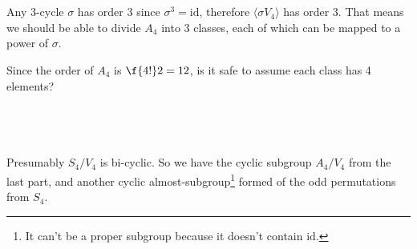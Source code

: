 \documentclass[a4paper]{article}
\begin{document}
\subsection{~} %

Any 3-cycle $\sigma$ has order 3 since $\sigma^3 = \mathrm{id}$, therefore $\langle \sigma V_4 \rangle$ has order 3. That means we should be able to divide $A_4$ into 3 classes, each of which can be mapped to a power of $\sigma$.

Since the order of $A_4$ is $\f{4!}2 = 12$, is it safe to assume each class has 4 elements?

\subsection{~} %

Presumably $S_4 / V_4$ is bi-cyclic. So we have the cyclic subgroup $A_4 / V_4$ from the last part, and another cyclic almost-subgroup\footnote{It can't be a proper subgroup because it doesn't contain $\mathrm{id}$.} formed of the odd permutations from $S_4$.

\end{document}
